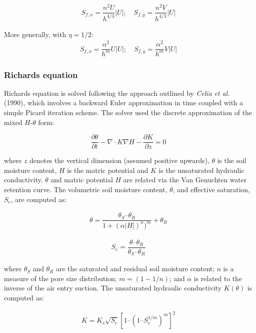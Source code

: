 \documentclass{article}
\begin{document}
\begin{eqnarray} \nonumber
S_{f,x} =  \dfrac{n^2 U}{h^{4/3}} |U|; \quad
S_{f,y} = \dfrac{n^2 V}{h^{4/3}} |U|
\end{eqnarray}

\noindent More generally, with $\eta=1/2$:
\begin{eqnarray} \nonumber
S_{f,x} = \dfrac{\alpha^2 }{h^m}  U |U|; \quad
S_{f,y} = \dfrac{\alpha^2 }{h^m} V |U|
\end{eqnarray}


\subsubsection*{Richards equation}

Richards equation is solved following the approach outlined by \textit{Celia et al.} (1990), which involves a backward Euler approximation in time coupled with a simple Picard iteration scheme.  
The solver used the discrete approximation of the  mixed $H$-$\theta$ form: 

\begin{equation} 
	\dfrac{\partial \theta}{\partial t} - \nabla \cdot K \nabla H - \dfrac{\partial K}{\partial z} = 0
\label{richards}
\end{equation}

\noindent where $z$ denotes the vertical dimension (assumed positive upwards),  $\theta$ is the soil moisture content, $H$ is the matric potential and $K$ is the unsaturated hydraulic conductivity.
 $\theta$ and matric potential $H$ are related via the Van Genuchten water retention curve. The volumetric soil moisture content, $\theta$, and effective saturation, $S_e$, are computed as:

\begin{eqnarray} \nonumber
\theta = \dfrac{\theta_S – \theta_R}{1 + (\alpha|H|)^n)^m} + \theta_R
\label{vanG_eqn}
\end{eqnarray}

\begin{eqnarray} \nonumber
S_e = \dfrac{\theta – \theta_R}{\theta_S – \theta_R}
\label{Se}
\end{eqnarray}

 where $\theta_S$ and  $\theta_R$ are the saturated and residual soil moisture content; $n$ is a measure of the pore size distribution; $m=(1-1/n)$; and $\alpha$  is related to the inverse of the air entry suction.  The unsaturated hydraulic conductivity $K(\theta)$ is computed as:

\begin{eqnarray}
K = K_s \sqrt{S_e} [1 – (1 – S_e^{1/m})^m]^2
\label{K}
\end{eqnarray}
\end{document}
